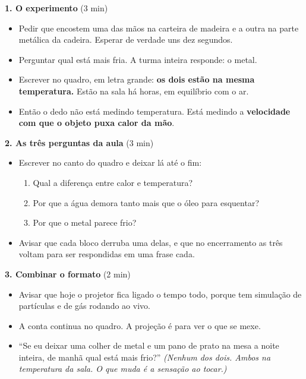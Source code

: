 \documentclass[11pt,a4paper]{article}
\begin{document}
\begin{quadro}
\textbf{1. O experimento} (3 min)
\begin{itemize}[nosep]
  \item Pedir que encostem uma das m\~aos na carteira de madeira e a outra
        na parte met\'alica da cadeira. Esperar de verdade uns dez segundos.
  \item Perguntar qual est\'a mais fria. A turma inteira responde: o metal.
  \item Escrever no quadro, em letra grande:
        \textbf{os dois est\~ao na mesma temperatura.} Est\~ao na sala h\'a
        horas, em equil\'ibrio com o ar.
  \item Ent\~ao o dedo n\~ao est\'a medindo temperatura. Est\'a medindo a
        \textbf{velocidade com que o objeto puxa calor da m\~ao}.
\end{itemize}

\medskip
\textbf{2. As tr\^es perguntas da aula} (3 min)
\begin{itemize}[nosep]
  \item Escrever no canto do quadro e deixar l\'a at\'e o fim:
  \begin{enumerate}[nosep, label=(\alph*)]
    \item Qual a diferen\c{c}a entre calor e temperatura?
    \item Por que a \'agua demora tanto mais que o \'oleo para esquentar?
    \item Por que o metal parece frio?
  \end{enumerate}
  \item Avisar que cada bloco derruba uma delas, e que no encerramento
        as tr\^es voltam para ser respondidas em uma frase cada.
\end{itemize}

\medskip
\textbf{3. Combinar o formato} (2 min)
\begin{itemize}[nosep]
  \item Avisar que hoje o projetor fica ligado o tempo todo, porque tem
        simula\c{c}\~ao de part\'iculas e de g\'as rodando ao vivo.
  \item A conta continua no quadro. A proje\c{c}\~ao \'e para ver o que se mexe.
\end{itemize}
\end{quadro}

\begin{perguntas}
\begin{itemize}[nosep]
  \item ``Se eu deixar uma colher de metal e um pano de prato na mesa a
        noite inteira, de manh\~a qual est\'a mais frio?''
        \textit{(Nenhum dos dois. Ambos na temperatura da sala. O que
        muda \'e a sensa\c{c}\~ao ao tocar.)}
\end{itemize}
\end{perguntas}
\end{document}
